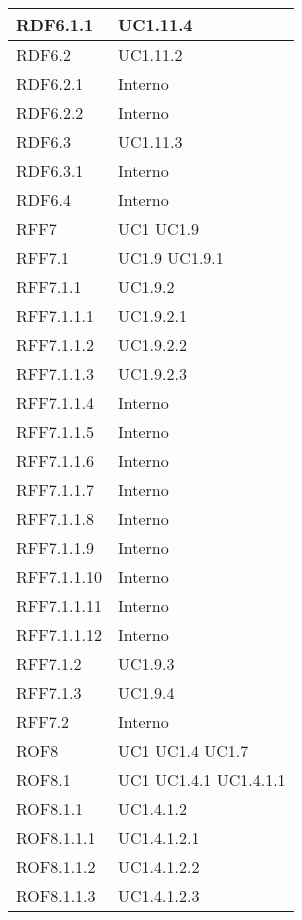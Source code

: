 \begin{center}
\begin{longtable}{| p{4cm} | p{4cm} |}
\hline
RDF6.1.1   &  UC1.11.4 \\
\hline
RDF6.2   &  UC1.11.2 \\
\hline
RDF6.2.1   &  Interno \\
\hline
RDF6.2.2   &  Interno \\
\hline
RDF6.3   &  UC1.11.3 \\
\hline
RDF6.3.1   &  Interno \\
\hline
RDF6.4   &  Interno \\
\hline
RFF7   &  UC1 \newline UC1.9 \\
\hline
RFF7.1   &  UC1.9 \newline UC1.9.1 \\
\hline
RFF7.1.1   &  UC1.9.2  \\
\hline
RFF7.1.1.1   &  UC1.9.2.1 \\
\hline
RFF7.1.1.2   &  UC1.9.2.2 \\
\hline
RFF7.1.1.3   &  UC1.9.2.3 \\
\hline
RFF7.1.1.4   &  Interno \\
\hline
RFF7.1.1.5   &  Interno \\
\hline
RFF7.1.1.6   &  Interno \\
\hline
RFF7.1.1.7   &  Interno \\
\hline
RFF7.1.1.8   &  Interno \\
\hline
RFF7.1.1.9   &  Interno \\
\hline
RFF7.1.1.10   &  Interno \\
\hline
RFF7.1.1.11   &  Interno \\
\hline
RFF7.1.1.12   &  Interno \\
\hline
RFF7.1.2   &  UC1.9.3  \\
\hline
RFF7.1.3   &  UC1.9.4  \\
\hline
RFF7.2   &  Interno \\
\hline
ROF8   &  UC1 \newline UC1.4 \newline UC1.7 \\
\hline
ROF8.1   &  UC1 \newline UC1.4.1 \newline UC1.4.1.1 \\
\hline
ROF8.1.1   &  UC1.4.1.2 \\
\hline
ROF8.1.1.1   &  UC1.4.1.2.1 \\
\hline
ROF8.1.1.2   &  UC1.4.1.2.2 \\
\hline
ROF8.1.1.3   &  UC1.4.1.2.3 \\
\hline

\end{longtable}
\end{center}
